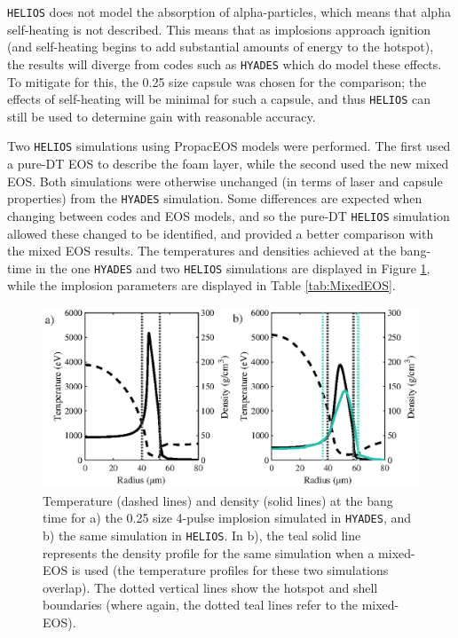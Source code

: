 \texttt{HELIOS} does not model the absorption of alpha-particles, which means that alpha self-heating is not described. This means that as implosions approach ignition (and self-heating begins to add substantial amounts of energy to the hotspot), the results will diverge from codes such as \texttt{HYADES} which do model these effects. To mitigate for this, the 0.25 size capsule was chosen for the comparison; the effects of self-heating will be minimal for such a capsule, and thus \texttt{HELIOS} can still be used to determine gain with reasonable accuracy.

Two \texttt{HELIOS} simulations using PropacEOS models were performed. The first used a pure-DT EOS to describe the foam layer, while the second used the new mixed EOS. Both simulations were otherwise unchanged (in terms of laser and capsule properties) from the \texttt{HYADES} simulation. Some differences are expected when changing between codes and EOS models, and so the pure-DT \texttt{HELIOS} simulation allowed these changed to be identified, and provided a better comparison with the mixed EOS results. The temperatures and densities achieved at the bang-time in the one \texttt{HYADES} and two \texttt{HELIOS} simulations are displayed in Figure \ref{fig:MixedEOS}, while the implosion parameters are displayed in Table \ref{tab:MixedEOS}.

\begin{figure} 
	\centering     %
	\includegraphics[width=.8\textwidth]{figures/FurtherSims/MixedEOS.eps}
	\caption{\label{fig:MixedEOS} Temperature (dashed lines) and density (solid lines) at the bang time for a) the 0.25 size 4-pulse implosion simulated in \texttt{HYADES}, and b) the same simulation in \texttt{HELIOS}. In b), the teal solid line represents the density profile for the same simulation when a mixed-EOS is used (the temperature profiles for these two simulations overlap). The dotted vertical lines show the hotspot and shell boundaries (where again, the dotted teal lines refer to the mixed-EOS).}
\end{figure}

